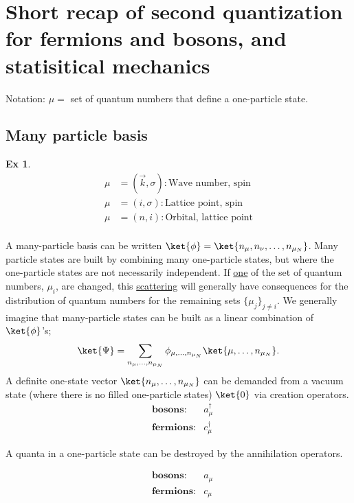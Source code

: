 \section{Short recap of second quantization for fermions and bosons, and statisitical mechanics}

Notation: $ \mu = $ set of quantum numbers that define a one-particle state.


\subsection{Many particle basis}
\newtheorem{theorem}{Ex}
\begin{theorem}


\begin{align*}
\mu &= (\vec{k}, \sigma):\text{Wave number, spin} \\
\mu &= (i, \sigma) : \text{Lattice point, spin} \\
\mu &= (n, i) : \text{Orbital, lattice point} \\
\end{align*}

\end{theorem}

A many-particle basis can be written $\ket{\phi} = \ket{n_{\mu}, n_{\nu}, \dots, n_{\mu_N}}$. Many particle states are built by combining many one-particle states, but where the one-particle states are not necessarily independent. If  \underline{one} of the set of quantum numbers, $\mu_i$, are changed, this \underline{scattering} will generally have consequences for the distribution of quantum numbers for the remaining sets $\{\mu_j\}_{j\ne i}$.
We generally imagine that many-particle states can be built as a linear combination of
$\ket{\phi}$'s;
\begin{equation}
\ket{\Psi} = \sum_{n_{\mu},\dots, n_{\mu_N}}\phi_{{\mu},\dots, n_{\mu_N}}\ket{{\mu},\dots, n_{\mu_N}}.
\end{equation}
A definite one-state vector $\ket{n_{\mu},\dots, n_{\mu_N}}$ can be demanded from a vacuum state (where there is no filled one-particle states) $\ket{0}$ via creation operators.
\begin{align*}
&\textbf{bosons}: &a_\mu^\dagger \\ 
&\textbf{fermions}: &c_\mu^\dagger
\end{align*}


A quanta in a one-particle state can be destroyed by the annihilation operators.

\begin{align*}
&\textbf{bosons}: &a_\mu \\ 
&\textbf{fermions}: &c_\mu
\end{align*}


